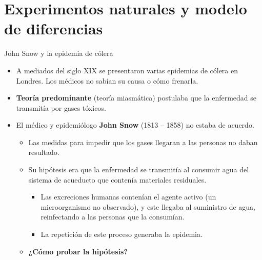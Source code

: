 \documentclass[10pt, xcolor=dvipsnames]{beamer}
\begin{document}
\section{Experimentos naturales y modelo de diferencias}

\begin{frame}{John Snow y la epidemia de cólera}
\begin{itemize}\setlength{\itemsep}{1.0em}
	\item A mediados del siglo XIX se presentaron varias epidemias de cólera en Londres. Los médicos no sabían su causa o cómo frenarla.
	\item \textbf{Teoría predominante} (teoría miasmática) postulaba que la enfermedad se transmitía por gases tóxicos.
	\item El médico y epidemiólogo \textbf{John Snow} (1813 – 1858) no estaba de acuerdo.
\begin{itemize}\setlength{\itemsep}{0.75em}
	\item Las medidas para impedir que los gases llegaran a las personas no daban resultado. %
	\item Su hipótesis era que la enfermedad se transmitía al consumir agua del sistema de acueducto que contenía materiales residuales.
	\begin{itemize}
	\item Las excreciones humanas contenían el agente activo (un microorganismo no observado), y este llegaba al suministro de agua, reinfectando a las personas que la consumían.
	\item La repetición de este proceso generaba la epidemia.
	\end{itemize}
    \item \textbf{¿Cómo probar la hipótesis?}
\end{itemize}
\end{itemize}	
\end{frame}
\end{document}
